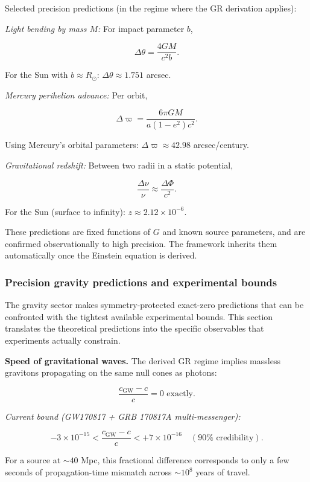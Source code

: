 \documentclass[11pt,a4paper]{article}
\theoremstyle{remark}
\begin{document}
Selected precision predictions (in the regime where the GR derivation applies):

\emph{Light bending by mass \(M\):} For impact parameter \(b\),

\[
\Delta\theta = \frac{4GM}{c^2 b}.
\]

For the Sun with \(b \approx R_\odot\): \(\Delta\theta \approx 1.751\) arcsec.

\emph{Mercury perihelion advance:} Per orbit,

\[
\Delta\varpi = \frac{6\pi GM}{a(1-e^2)c^2}.
\]

Using Mercury's orbital parameters: \(\Delta\varpi \approx 42.98\) arcsec/century.

\emph{Gravitational redshift:} Between two radii in a static potential,

\[
\frac{\Delta\nu}{\nu} \approx \frac{\Delta\Phi}{c^2}.
\]

For the Sun (surface to infinity): \(z \approx 2.12 \times 10^{-6}\).

These predictions are fixed functions of \(G\) and known source parameters, and
are confirmed observationally to high precision. The framework inherits them
automatically once the Einstein equation is derived.

\subsubsection{Precision gravity predictions and experimental bounds}\label{precision-gravity-predictions-and-experimental-bounds}

The gravity sector makes symmetry-protected exact-zero predictions that can be
confronted with the tightest available experimental bounds. This section
translates the theoretical predictions into the specific observables that
experiments actually constrain.

\textbf{Speed of gravitational waves.} The derived GR regime implies massless
gravitons propagating on the same null cones as photons:

\[
\frac{c_{\mathrm{GW}} - c}{c} = 0 \text{ exactly.}
\]

\emph{Current bound (GW170817 + GRB 170817A multi-messenger):}

\[
-3 \times 10^{-15} < \frac{c_{\mathrm{GW}} - c}{c} < +7 \times 10^{-16}
\quad (90\% \text{ credibility}).
\]

For a source at \(\sim 40\) Mpc, this fractional difference corresponds to only
a few seconds of propagation-time mismatch across \(\sim 10^8\) years of travel.
\end{document}
